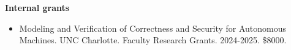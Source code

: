 \documentclass[11pt]{article}
\begin{document}
\textbf{Internal grants}
\begin{itemize}
  \item Modeling and Verification of Correctness and Security for Autonomous Machines. UNC Charlotte. Faculty Research Grants. 2024-2025. \$8000. 
\end{itemize}





    
\end{document}

